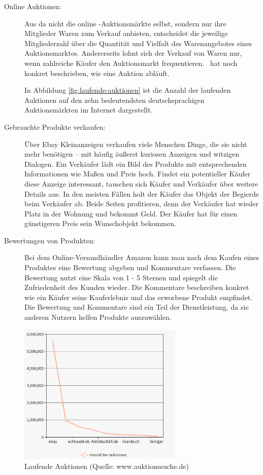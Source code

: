 \begin{description}
\item[Online Auktionen:] Aus \textcite[Kapitel 4: Wirtschaftliche Bedeutung von Ebay, S. 71]{hinneburg} \glqq da nicht die online -Auktionsmärkte selbst, sondern nur ihre Mitglieder Waren zum Verkauf anbieten, entscheidet die jeweilige Mitgliederzahl über die Quantität und Vielfalt des Warenangebotes eines Auktionsmarktes. Andererseits lohnt sich der Verkauf von Waren nur, wenn zahlreiche Käufer den Auktionsmarkt frequentieren.\grqq ~\textcite[S. 72]{hinneburg} hat noch konkret beschrieben, wie eine Auktion abläuft.

In Abbildung \vref{fig:laufende-auktionen} ist die Anzahl der laufenden Auktionen auf den zehn bedeutendsten deutschsprachigen Auktionsmärkten im Internet dargestellt.

\item[Gebrauchte Produkte verkaufen: ] Über Ebay Kleinanzeigen verkaufen viele Menschen Dinge, die sie nicht mehr benötigen – mit häufig äußerst kuriosen Anzeigen und witzigen Dialogen. Ein Verkäufer lädt ein Bild des Produkts mit entsprechenden Informationen wie Maßen und Preis hoch. Findet ein potentieller Käufer diese Anzeige interessant, tauschen sich Käufer und Verkäufer über weitere Details aus. In den meisten Fällen holt der Käufer das Objekt der Begierde beim Verkäufer ab. Beide Seiten profitieren, denn der Verkäufer hat wieder Platz in der Wohnung und bekommt Geld. Der Käufer hat für einen günstigeren Preis sein Wunschobjekt bekommen.

\item[Bewertungen von Produkten: ] Bei dem Online-Versandhändler Amazon kann man nach dem Kaufen eines Produktes eine Bewertung abgeben und Kommentare verfassen. Die Bewertung nutzt eine Skala von 1 - 5 Sternen und spiegelt die Zufriedenheit des Kunden wieder. Die Kommentare beschreiben konkret wie ein Käufer seine Kauferlebnis und das erworbene Produkt empfindet. Die Bewertung und Kommentare sind ein Teil der Dienstleistung, da sie anderen Nutzern helfen Produkte auszuwählen.
\end{description}

\begin{figure}
	\centering
	\includegraphics[width=0.7\textwidth]{bilder/laufende-auktionen.png}
	\caption[Laufende Auktionen]{Laufende Auktionen (Quelle: www.auktionssuche.de)}
	\label{fig:laufende-auktionen}
\end{figure}


